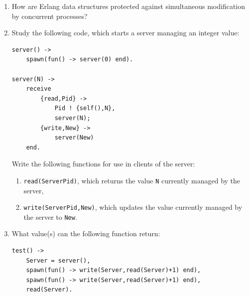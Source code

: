 \documentclass{article}
\begin{document}
\begin{enumerate}
\item
How are Erlang data structures protected against simultaneous
modification by concurrent processes?

\item
Study the following code, which starts a server managing an integer value:
\begin{verbatim}
server() ->
    spawn(fun() -> server(0) end).

server(N) ->
    receive
        {read,Pid} ->
            Pid ! {self(),N},
            server(N);
        {write,New} ->
            server(New)
    end.
\end{verbatim}
Write the following functions for use in clients of the server:
\begin{enumerate}
\item
\verb!read(ServerPid)!, which returns the value \verb!N! currently managed by the server,
\item
\verb!write(ServerPid,New)!, which updates the value currently managed by the server to \verb!New!.
\end{enumerate}

\item
What value(s) can the following function return:
\begin{verbatim}
test() ->
    Server = server(),
    spawn(fun() -> write(Server,read(Server)+1) end),
    spawn(fun() -> write(Server,read(Server)+1) end),
    read(Server).
\end{verbatim}


\end{enumerate}
\end{document}
